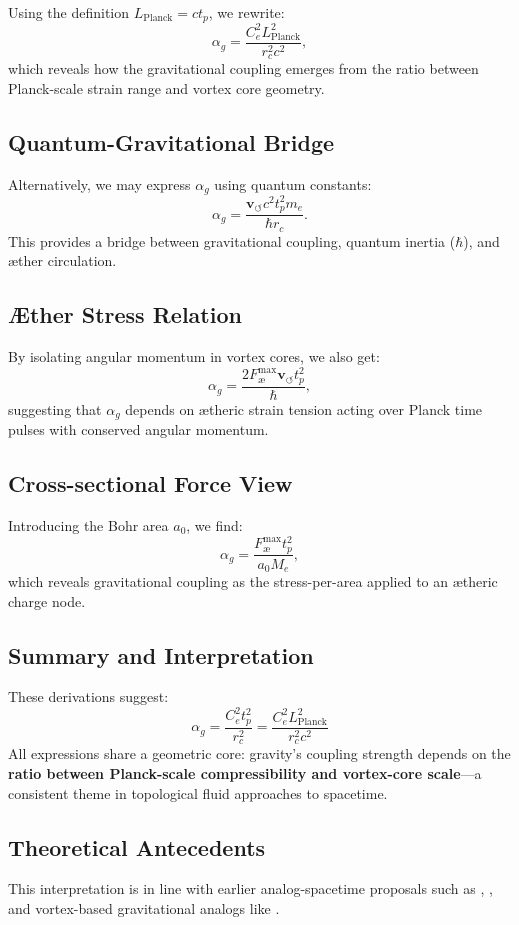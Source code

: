 Using the definition $L_{\text{Planck}} = c t_p$, we rewrite:
\[
    \alpha_g = \frac{C_e^2 L_{\text{Planck}}^2}{r_c^2 c^2},
\]
which reveals how the gravitational coupling emerges from the ratio between Planck-scale strain range and vortex core geometry.

\subsection{Quantum-Gravitational Bridge}

Alternatively, we may express $\alpha_g$ using quantum constants:
\[
    \alpha_g = \frac{\mathbf{v}_{\scriptscriptstyle\boldsymbol{\circlearrowleft}} c^2 t_p^2 m_e}{\hbar r_c}.
\]
This provides a bridge between gravitational coupling, quantum inertia ($\hbar$), and æther circulation.

\subsection*{Æther Stress Relation}

By isolating angular momentum in vortex cores, we also get:
\[
    \alpha_g = \frac{2 F^{\text{max}}_{\text{\ae}} \mathbf{v}_{\scriptscriptstyle\boldsymbol{\circlearrowleft}} t_p^2}{\hbar},
\]
suggesting that $\alpha_g$ depends on ætheric strain tension acting over Planck time pulses with conserved angular momentum.

\subsection*{Cross-sectional Force View}

Introducing the Bohr area $a_0$, we find:
\[
    \alpha_g = \frac{F^{\text{max}}_{\text{\ae}} t_p^2}{a_0 M_e},
\]
which reveals gravitational coupling as the stress-per-area applied to an ætheric charge node.

\subsection*{Summary and Interpretation}

These derivations suggest:
\[
    \boxed{
        \alpha_g = \frac{C_e^2 t_p^2}{r_c^2} = \frac{C_e^2 L_{\text{Planck}}^2}{r_c^2 c^2}
    }
\]
All expressions share a geometric core: gravity's coupling strength depends on the \textbf{ratio between Planck-scale compressibility and vortex-core scale}—a consistent theme in topological fluid approaches to spacetime.

\subsection*{Theoretical Antecedents}

This interpretation is in line with earlier analog-spacetime proposals such as \cite{barcelo2011}, \cite{volovik2003universe}, and vortex-based gravitational analogs like \cite{ranada1989topological}.